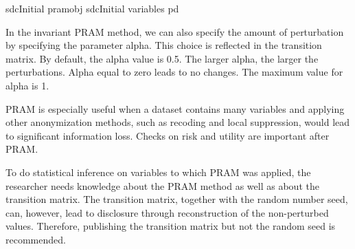 \documentclass[letterpaper,10pt,english]{sphinxmanual}
\begin{document}
\def\sphinxLiteralBlockLabel{\label{\detokenize{anon_methods:code514}}}
%
\begin{sphinxVerbatim}[commandchars=\\\{\},numbers=left,firstnumber=1,stepnumber=1]
 sdcInitial  pramobj  sdcInitial variables   pd     
\end{sphinxVerbatim}

In the invariant PRAM method, we can also specify the amount of
perturbation by specifying the parameter alpha. This choice is reflected
in the transition matrix. By default, the alpha value is 0.5. The larger
alpha, the larger the perturbations. Alpha equal to zero leads to no
changes. The maximum value for alpha is 1.

PRAM is especially useful when a dataset contains many variables and
applying other anonymization methods, such as recoding and local
suppression, would lead to significant information loss. Checks on risk
and utility are important after PRAM.

To do statistical inference on variables to which PRAM was applied, the
researcher needs knowledge about the PRAM method as well as about the
transition matrix. The transition matrix, together with the random
number seed, can, however, lead to disclosure through reconstruction of
the non-perturbed values. Therefore, publishing the transition matrix
but not the random seed is recommended.
\end{document}
